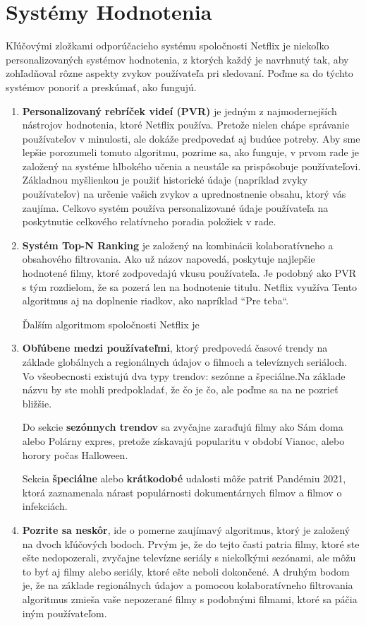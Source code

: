 \documentclass[10pt,slovak,a4paper]{article}
\begin{document}
\section{Systémy Hodnotenia}
 Kľúčovými zložkami odporúčacieho systému spoločnosti Netflix je niekoľko personalizovaných systémov hodnotenia, z ktorých každý je navrhnutý tak, aby zohľadňoval rôzne aspekty zvykov používateľa pri sledovaní. Poďme sa do týchto systémov ponoriť a preskúmať, ako fungujú.
\begin{enumerate}
    \item \textbf{Personalizovaný rebríček videí (PVR)} je jedným z najmodernejších  nástrojov\cite{Hodnotenie} hodnotenia, ktoré Netflix používa. Pretože nielen chápe správanie používateľov v minulosti, ale dokáže predpovedať aj budúce potreby. Aby sme lepšie porozumeli tomuto algoritmu, pozrime sa, ako funguje, v prvom rade je založený na systéme hlbokého učenia a neustále sa prispôsobuje používateľovi. Základnou myšlienkou je použiť historické údaje (napríklad zvyky používateľov) na určenie vašich zvykov a uprednostnenie obsahu, ktorý vás zaujíma. Celkovo systém používa personalizované údaje používateľa na poskytnutie celkového relatívneho poradia položiek v rade.

    \item \textbf{Systém Top-N Ranking} je založený na kombinácii kolaboratívneho a obsahového filtrovania. Ako už názov napovedá, poskytuje najlepšie hodnotené filmy, ktoré zodpovedajú vkusu používateľa. Je podobný ako PVR s tým rozdielom, že sa pozerá len na hodnotenie titulu. Netflix využíva Tento algoritmus aj na doplnenie riadkov, ako napríklad  “Pre teba“.

    Ďalším algoritmom spoločnosti Netflix je 
    \item\textbf{Obľúbene medzi používateľmi}, ktorý predpovedá časové trendy na základe globálnych a regionálnych údajov o filmoch a televíznych seriáloch. Vo všeobecnosti existujú dva typy trendov: sezónne a špeciálne.Na základe názvu by ste mohli predpokladať, že čo je čo, ale poďme sa na ne pozrieť bližšie.
    
    Do sekcie \textbf{sezónnych trendov} sa zvyčajne zaraďujú filmy ako Sám doma alebo Polárny expres, pretože získavajú popularitu v období Vianoc, alebo horory počas Halloween.

    Sekcia \textbf{špeciálne} alebo \textbf{krátkodobé} udalosti môže patriť Pandémiu 2021, ktorá zaznamenala nárast populárnosti dokumentárnych filmov a filmov o infekciách.

    \item \textbf{Pozrite sa neskôr}, ide o pomerne zaujímavý algoritmus, ktorý je založený na dvoch kľúčových bodoch. Prvým je, že do tejto časti patria filmy, ktoré ste ešte nedopozerali, zvyčajne televízne seriály s niekoľkými sezónami, ale môžu to byť aj filmy alebo seriály, ktoré ešte neboli dokončené. A druhým bodom je, že na základe regionálnych údajov a pomocou kolaboratívneho filtrovania algoritmus zmieša vaše nepozerané filmy s podobnými filmami, ktoré sa páčia iným používateľom.
    
\end{enumerate}
\end{document}
